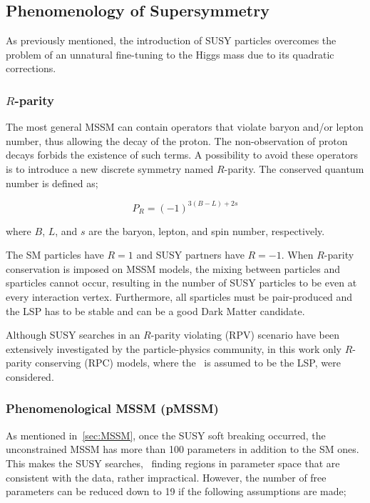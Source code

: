 		\subsection{Phenomenology of Supersymmetry}
		\label{sec:SUSYPheno}

			As previously mentioned, the introduction of \ac{SUSY} particles overcomes the problem of an unnatural fine-tuning to the Higgs mass due to its quadratic corrections.%

			\subsubsection*{$R$-parity}
				
				The most general \ac{MSSM} can contain operators that violate baryon and/or lepton number, thus allowing the decay of the proton. The non-observation of proton decays forbids the existence of such terms. A possibility to avoid these operators is to introduce a new discrete symmetry named $R$-parity. The conserved quantum number is defined as;

				\begin{equation}
					P_R = \left ( -1 \right )^{3 \left (B - L \right )+ 2s}
				\end{equation}

				\noindent where $B$, $L$, and $s$ are the baryon, lepton, and spin number, respectively.	

				The \ac{SM} particles have $R = 1$ and \ac{SUSY} partners have $R=-1$. When $R$-parity conservation is imposed on \ac{MSSM} models, the mixing between particles and sparticles cannot occur, resulting in the number of \ac{SUSY} particles to be even at every interaction vertex. Furthermore, all sparticles must be pair-produced and the \ac{LSP} has to be stable and can be a good Dark Matter candidate. %

				Although \ac{SUSY} searches in an $R$-parity violating (RPV) scenario have been extensively investigated by the particle-physics community, in this work only $R$-parity conserving (RPC) models, where the \ninoone\ is assumed to be the \ac{LSP}, were considered.

			\subsubsection*{Phenomenological \ac{MSSM} (pMSSM)}

				As mentioned in~\ref{sec:MSSM}, once the \ac{SUSY} soft breaking occurred, the unconstrained \ac{MSSM} has more than 100 parameters in addition to the \ac{SM} ones. This makes the \ac{SUSY} searches, \eg\ finding regions in parameter space that are consistent with the data, rather impractical. However, the number of free parameters can be reduced down to 19 if the following  assumptions are made; 

